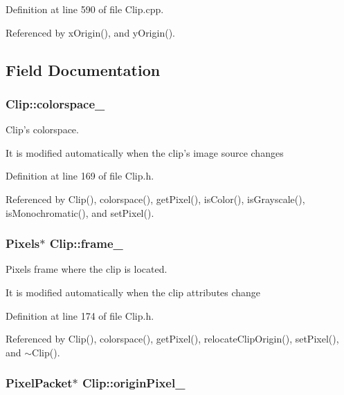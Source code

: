 Definition at line 590 of file Clip.cpp.

Referenced by xOrigin(), and yOrigin().

\subsection{Field Documentation}
\hypertarget{class_clip_51b03c04118374cedeaa0d7a0ba37079}{
\subsubsection[colorspace\_\-]{ {\bf Clip::colorspace\_\-}}}
\label{class_clip_51b03c04118374cedeaa0d7a0ba37079}


Clip's colorspace. 

It is modified automatically when the clip's image source changes 

Definition at line 169 of file Clip.h.

Referenced by Clip(), colorspace(), getPixel(), isColor(), isGrayscale(), isMonochromatic(), and setPixel().\hypertarget{class_clip_2978b7e7061c444375c005ffc3d24416}{
\subsubsection[frame\_\-]{\setlength{\rightskip}{0pt plus 5cm}Pixels$\ast$ {\bf Clip::frame\_\-}}}
\label{class_clip_2978b7e7061c444375c005ffc3d24416}


Pixels frame where the clip is located. 

It is modified automatically when the clip attributes change 

Definition at line 174 of file Clip.h.

Referenced by Clip(), colorspace(), getPixel(), relocateClipOrigin(), setPixel(), and $\sim$Clip().\hypertarget{class_clip_838228267146fd74e2828b7173b61091}{
\subsubsection[originPixel\_\-]{\setlength{\rightskip}{0pt plus 5cm}PixelPacket$\ast$ {\bf Clip::originPixel\_\-}}}
\label{class_clip_838228267146fd74e2828b7173b61091}


